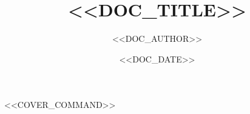 \documentclass[<<FONT_SIZE>>pt,a4paper]{article}
\title{<<DOC_TITLE>>}
\author{<<DOC_AUTHOR>>}
\date{<<DOC_DATE>>}
\begin{document}
<<COVER_COMMAND>>


\end{document}
